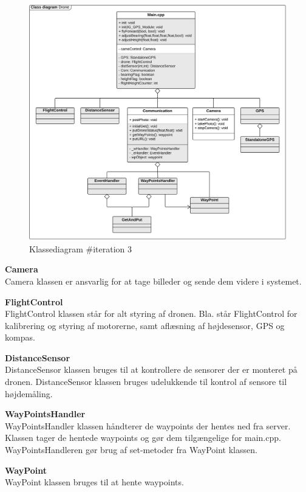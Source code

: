 \begin{figure}[H]
	\centering
	\includegraphics[width=1\textwidth]{Billeder/klasse_diagrammer/classdiagram_iteration3_drone.png}
	\vspace{-0.5cm}
	\caption{Klassediagram \#iteration 3}
	\label{fig:classDiagram_iteration3}
\end{figure}


\textbf{Camera} \\
Camera klassen er ansvarlig for at tage billeder og sende dem videre i systemet. 

\textbf{FlightControl} \\
FlightControl klassen står for alt styring af dronen. Bla. står FlightControl for kalibrering og styring af motorerne, samt aflæsning af højdesensor, GPS og kompas. 

\textbf{DistanceSensor} \\
DistanceSensor klassen bruges til at kontrollere de sensorer der er monteret på dronen. DistanceSensor klassen bruges udelukkende til kontrol af sensore til højdemåling. 

\textbf{WayPointsHandler} \\
WayPointsHandler klassen håndterer de waypoints der hentes ned fra server. Klassen tager de hentede waypoints og gør dem tilgængelige for main.cpp. WayPointsHandleren gør brug af set-metoder fra WayPoint klassen.

\textbf{WayPoint} \\
WayPoint klassen bruges til at hente waypoints.  

